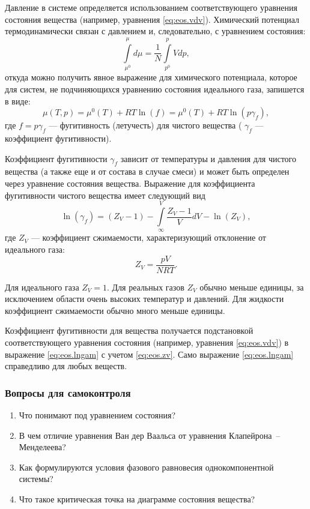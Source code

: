 Давление в системе определяется использованием соответствующего уравнения состояния вещества (например, уравнения \eqref{eq:eos.vdv}). Химический потенциал термодинамически связан с давлением и, следовательно, с уравнением состояния: 
\begin{equation}
	\int\limits_{\mu^0}^{\mu} d \mu = \dfrac{1}{N} \int\limits_{p^0}^{p} V dp,
\end{equation}
откуда можно получить явное выражение для химического потенциала, которое для систем, не подчиняющихся уравнению состояния идеального газа, запишется в виде:
\begin{equation}
	\mu(T,p)=\mu^0(T)+R T \ln (f)=\mu^0 (T) + R T \ln (p \gamma_f),
\end{equation}
где $f=p \gamma_f$ --- фугитивность (летучесть) для чистого вещества ( $\gamma_f$ --- коэффициент фугитивности).

Коэффициент фугитивности $\gamma_f$ зависит от температуры и давления для чистого вещества (а также еще и от состава в случае смеси) и может быть определен через уравнение состояния вещества. Выражение для коэффициента фугитивности чистого вещества имеет следующий вид
\begin{equation}\label{eq:eos.lngam}
	\ln (\gamma_f) = (Z_V -1) - \int\limits_{\infty}^{V} {\dfrac{Z_V-1}{V} d V} -\ln(Z_V),
\end{equation}
где $Z_V$ --- коэффициент  сжимаемости, характеризующий отклонение от идеального газа:
\begin{equation} \label{eq:eos.zv}
	Z_V=\dfrac{p V}{N R T}.
\end{equation}

Для идеального газа $Z_V=1$. Для реальных газов $Z_V$ обычно меньше единицы, за исключением области очень высоких температур и давлений. Для жидкости коэффициент сжимаемости обычно много меньше единицы.

Коэффициент фугитивности для вещества получается подстановкой соответствующего уравнения состояния (например, уравнения \eqref{eq:eos.vdv}) в выражение \eqref{eq:eos.lngam} с учетом \eqref{eq:eos.zv}. Само выражение \eqref{eq:eos.lngam} справедливо для любых веществ. 

\subsubsection*{Вопросы для самоконтроля}
\begin{enumerate}
\item Что понимают под уравнением состояния?
\item В чем отличие уравнения Ван дер Ваальса от уравнения Клапейрона~-- Менделеева?
\item Как формулируются условия фазового равновесия однокомпонентной системы?
\item Что такое критическая точка на диаграмме состояния вещества?
\end{enumerate}


